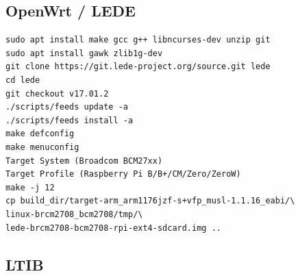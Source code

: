 \documentclass[printmode]{mgr}
\begin{document}






\subsection{OpenWrt / LEDE}

\begin{lstlisting}
sudo apt install make gcc g++ libncurses-dev unzip git
sudo apt install gawk zlib1g-dev
git clone https://git.lede-project.org/source.git lede
cd lede
git checkout v17.01.2
./scripts/feeds update -a
./scripts/feeds install -a
make defconfig
make menuconfig
Target System (Broadcom BCM27xx)
Target Profile (Raspberry Pi B/B+/CM/Zero/ZeroW)
make -j 12
cp build_dir/target-arm_arm1176jzf-s+vfp_musl-1.1.16_eabi/\
linux-brcm2708_bcm2708/tmp/\
lede-brcm2708-bcm2708-rpi-ext4-sdcard.img ..
\end{lstlisting}



\subsection{LTIB}


\end{document}
